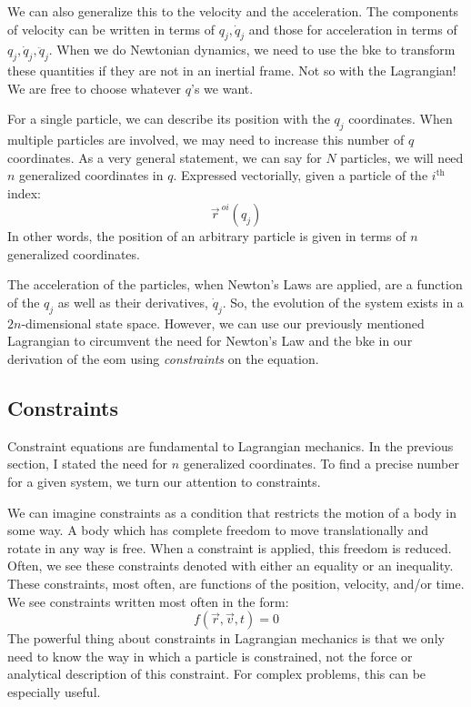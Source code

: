 We can also generalize this to the velocity and the acceleration. The components of velocity can be written in terms of $q_j, \dot{q}_j$ and those for acceleration in terms of $q_j, \dot{q}_j, \ddot{q}_j$.  When we do Newtonian dynamics, we need to use the \gls{bke} to transform these quantities if they are not in an \gls{inertial frame}. Not so with the \gls{Lagrangian}! We are free to choose whatever $q$'s we want.

For a single particle, we can describe its position with the $q_j$ coordinates. When multiple particles are involved, we may need to increase this number of $q$ coordinates. As a very general statement, we can say for $N$ particles, we will need $n$ generalized coordinates in $q$. Expressed vectorially, given a particle of the $i^{\mathrm{th}}$ index:
$$\vec{r}^{\ oi}(q_j)$$
In other words, the position of an arbitrary particle is given in terms of $n$ generalized coordinates. 

The acceleration of the particles, when Newton's Laws are applied, are a function of the $q_j$ as well as their derivatives, $\dot{q}_j$. So, the evolution of the system exists in a $2n$-dimensional state space. However, we can use our previously mentioned \gls{Lagrangian} to circumvent the need for Newton's Law and the \gls{bke} in our derivation of the \gls{eom} using \textit{constraints} on the equation.

\subsection{Constraints}\label{sec:constaints}
Constraint equations are fundamental to \gls{Lagrangian} mechanics. In the previous section, I stated the need for $n$ generalized coordinates. To find a precise number for a given system, we turn our attention to constraints.

We can imagine constraints as a condition that restricts the motion of a body in some way. A body which has complete freedom to move translationally and rotate in any way is free. When a constraint is applied, this freedom is reduced. Often, we see these constraints denoted with either an equality or an inequality. These constraints, most often, are functions of the position, velocity, and/or time. We see constraints written most often in the form:
$$f(\vec{r},\vec{v},t)=0$$
The powerful thing about constraints in \gls{Lagrangian} mechanics is that we only need to know the way in which a particle is constrained, not the force or analytical description of this constraint. For complex problems, this can be especially useful.

